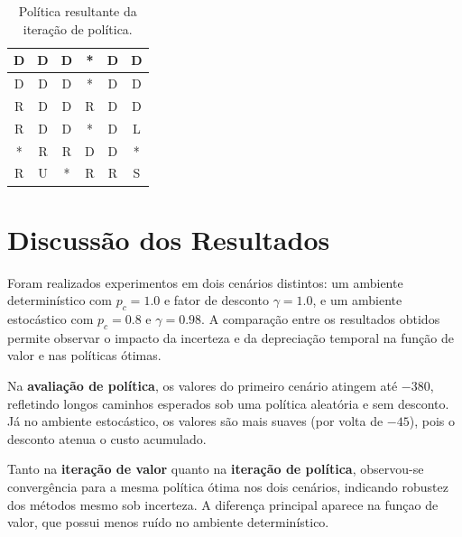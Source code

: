 \documentclass[a4paper,12pt]{article}
\begin{document}
\begin{table}[htbp]
\centering
\begin{tabular}{|c|c|c|c|c|c|}
\hline
D   & D   & D   & *   & D   & D    \\
\hline
D   & D   & D   & *   & D   & D    \\
\hline
R   & D   & D   & R   & D   & D    \\
\hline
R   & D   & D   & *   & D   & L    \\
\hline
*   & R   & R   & D   & D   & *    \\
\hline
R   & U   & *   & R   & R   & S    \\
\hline
\end{tabular}
\caption{Política resultante da iteração de política.}
\end{table}

\section{Discussão dos Resultados}

Foram realizados experimentos em dois cenários distintos: um ambiente determinístico com $p_c = 1.0$ e fator de desconto $\gamma = 1.0$, e um ambiente estocástico com $p_c = 0.8$ e $\gamma = 0.98$. A comparação entre os resultados obtidos permite observar o impacto da incerteza e da depreciação temporal na função de valor e nas políticas ótimas.

Na \textbf{avaliação de política}, os valores do primeiro cenário atingem até $-380$, refletindo longos caminhos esperados sob uma política aleatória e sem desconto. Já no ambiente estocástico, os valores são mais suaves (por volta de $-45$), pois o desconto atenua o custo acumulado.

Tanto na \textbf{iteração de valor} quanto na \textbf{iteração de política}, observou-se convergência para a mesma política ótima nos dois cenários, indicando robustez dos métodos mesmo sob incerteza. A diferença principal aparece na funçao de valor, que possui menos ruído no ambiente determinístico.
\end{document}
